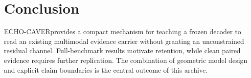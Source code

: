 \documentclass[10pt]{article}
\newcommand{\method}{\textsc{ECHO-CAVER}}
\begin{document}
\section{Conclusion}
\method provides a compact mechanism for teaching a frozen decoder to read an
existing multimodal evidence carrier without granting an unconstrained residual
channel. Full-benchmark results motivate retention, while clean paired evidence
requires further replication. The combination of geometric model design and
explicit claim boundaries is the central outcome of this archive.



\end{document}
